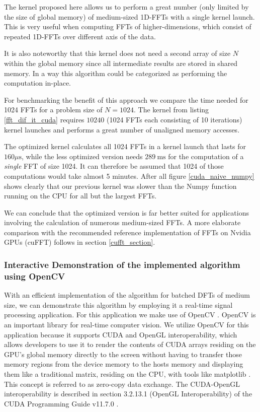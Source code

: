 \documentclass[english,11pt,a4paper,table]{article} %
\begin{document}

The kernel proposed here allows us to perform a great number (only limited by the size of global memory) of medium-sized 1D-FFTs with a single kernel launch.
This is very useful when computing FFTs of higher-dimensions, which consist of repeated 1D-FFTs over different axis of the data.

It is also noteworthy that this kernel does not need a second array of size $N$ within the global memory since all intermediate results are stored in shared memory. In a way this algorithm could be categorized as performing the computation in-place.

For benchmarking the benefit of this approach we compare the time needed for 1024 FFTs for a problem size of $N = 1024$. The kernel from listing \ref{fft_dif_it_cuda} requires $10240$ (1024 FFTs each consisting of 10 iterations) kernel launches and performs a great number of unaligned memory accesses.

The optimized kernel calculates all 1024 FFTs in a kernel launch that lasts for $160  \mu\text{s}$, while the less optimized version needs $289 \ \text{ms}$ for the computation of a \emph{single} FFT of size 1024.
It can therefore be assumed that 1024 of those computations would take almost 5 minutes.
After all figure \ref{cuda_naive_numpy} shows clearly that our previous kernel was slower than the Numpy function running on the CPU for all but the largest FFTs.

We can conclude that the optimized version is far better suited for applications involving the calculation of numerous medium-sized FFTs. A more elaborate comparison with the recommended reference implementation of FFTs on Nvidia GPUs (cuFFT) follows in section \ref{cufft_section}.

\subsubsection{Interactive Demonstration of the implemented algorithm using OpenCV}
\label{opencv_demo}

With an efficient implementation of the algorithm for batched DFTs of medium size, we can demonstrate this algorithm by employing it a real-time signal processing application.
For this application we make use of OpenCV \cite{opencv_library}.
OpenCV is an important library for real-time computer vision.
We utilize OpenCV for this application because it supports CUDA and OpenGL interoperability, which allows developers to use it to render the contents of CUDA arrays residing on the GPU's global memory directly to the screen without having to transfer those memory regions from the device memory to the hosts memory and displaying them like a traditional matrix, residing on the CPU, with tools like matplotlib \cite{Hunter:2007}.
This concept is referred to as zero-copy data exchange.
The CUDA-OpenGL interoperability is described in section 3.2.13.1 (OpenGL Interoperability) of the CUDA Programming Guide v11.7.0 \cite{Programming_Guide:online}.
\end{document}
